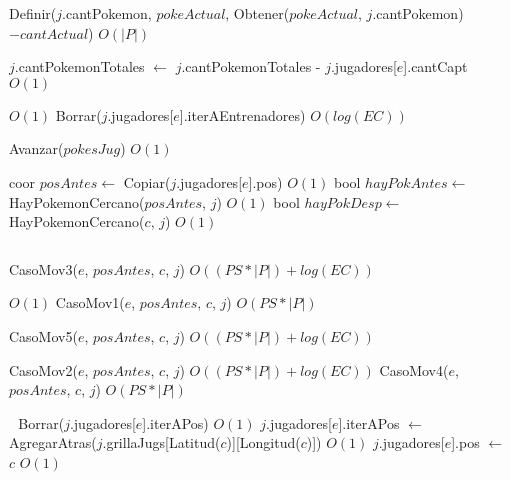 \begin{Algoritmos}
\begin{algorithmic}[1]
      \State Definir($j$.cantPokemon, $pokeActual$, Obtener($pokeActual$, $j$.cantPokemon)$-cantActual$) \Comment $O(|P|)$
    \EndWhile
    
    \State $j$.cantPokemonTotales $\gets$ $j$.cantPokemonTotales - $j$.jugadores[$e$].cantCapt \Comment $O(1)$
    
       \Comment $O(1)$
      \State Borrar($j$.jugadores[$e$].iterAEntrenadores) \Comment $O(log(EC))$
    \EndIf
    
    \State Avanzar($pokesJug$) \Comment $O(1)$

  \EndIf

\EndIf


  
  \State coor $posAntes \gets$ Copiar($j$.jugadores[$e$].pos)  \Comment $O(1)$
  \State bool $hayPokAntes \gets$ HayPokemonCercano($posAntes$, $j$)  \Comment $O(1)$
  \State bool $hayPokDesp \gets$ HayPokemonCercano($c$, $j$)  \Comment $O(1)$ 
  
  \Statex $ $
  
  
      \State CasoMov3($e$, $posAntes$, $c$, $j$)  \Comment $O((PS *|P|) + log(EC))$ 
          
    \Else %
        \Comment $O(1)$
        \State CasoMov1($e$, $posAntes$, $c$, $j$) \Comment $O(PS *|P|)$ 
      \Else

        \State CasoMov5($e$, $posAntes$, $c$, $j$) \Comment  $O((PS *|P|) + log(EC))$ 
      \EndIf    
    \EndIf
  \Else %
      
      \State CasoMov2($e$, $posAntes$, $c$, $j$) \Comment  $O((PS *|P|) + log(EC))$ 
    \Else
      \State CasoMov4($e$, $posAntes$, $c$, $j$) \Comment  $O(PS *|P|)$ 
    \EndIf    
    
  \EndIf
  
  \Statex $ $
  \Statex $ $
  \State Borrar($j$.jugadores[$e$].iterAPos) \Comment $O(1)$
  \State $j$.jugadores[$e$].iterAPos $\gets$ AgregarAtras($j$.grillaJugs[Latitud($c$)][Longitud($c$)]) \Comment $O(1)$
  \State $j$.jugadores[$e$].pos $\gets$ $c$ \Comment $O(1)$ 
  

\end{algorithmic}
\end{Algoritmos}
